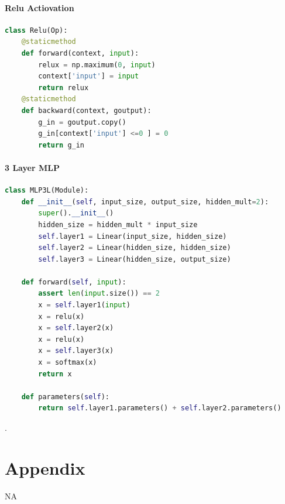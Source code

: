\documentclass[a4 paper]{article}
\begin{document}
\paragraph{Relu Actiovation}\textit{}
\begin{lstlisting}[language=Python]
class Relu(Op):
    @staticmethod
    def forward(context, input):
        relux = np.maximum(0, input)
        context['input'] = input 
        return relux 
    @staticmethod
    def backward(context, goutput):
        g_in = goutput.copy()
        g_in[context['input'] <=0 ] = 0
        return g_in
\end{lstlisting}

\paragraph{3 Layer MLP}\textit{}
\begin{lstlisting}[language=Python]
class MLP3L(Module):
    def __init__(self, input_size, output_size, hidden_mult=2):
        super().__init__()
        hidden_size = hidden_mult * input_size
        self.layer1 = Linear(input_size, hidden_size)
        self.layer2 = Linear(hidden_size, hidden_size)
        self.layer3 = Linear(hidden_size, output_size)

    def forward(self, input):
        assert len(input.size()) == 2
        x = self.layer1(input)
        x = relu(x)
        x = self.layer2(x)
        x = relu(x)
        x = self.layer3(x)
        x = softmax(x)
        return x

    def parameters(self):
        return self.layer1.parameters() + self.layer2.parameters()
\end{lstlisting}


\citep{eiben2003introduction}.

\renewcommand\bibliographytypesize{\small}



\appendix
\section*{Appendix}

NA
\end{document}
